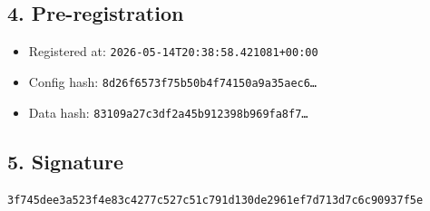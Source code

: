 \documentclass{article}
\begin{document}
\subsection*{4. Pre-registration}
\begin{itemize}
\item Registered at: \texttt{2026-05-14T20:38:58.421081+00:00}
\item Config hash: \texttt{8d26f6573f75b50b4f74150a9a35aec6\dots}
\item Data hash: \texttt{83109a27c3df2a45b912398b969fa8f7\dots}
\end{itemize}
\subsection*{5. Signature}
\texttt{3f745dee3a523f4e83c4277c527c51c791d130de2961ef7d713d7c6c90937f5e}\\
\end{document}
